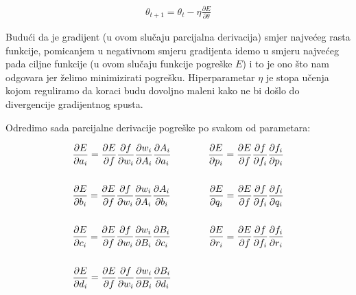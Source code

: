 \documentclass{article}
\begin{document}
\begin{align*}
	\theta_{t+1} = \theta_{t} - \eta\frac{\partial E}{\partial \theta} 
\end{align*}

Budući da je gradijent (u ovom slučaju parcijalna derivacija) smjer najvećeg rasta funkcije, pomicanjem u negativnom smjeru gradijenta idemo u smjeru najvećeg pada ciljne funkcije (u ovom slučaju funkcije pogreške $E$) i to je ono što nam odgovara jer želimo minimizirati pogrešku. Hiperparametar $\eta$ je stopa učenja kojom reguliramo da koraci budu dovoljno maleni kako ne bi došlo do divergencije gradijentnog spusta.


Odredimo sada parcijalne derivacije pogreške po svakom od parametara:

\begin{align*}
	&\frac{\partial E}{\partial a_{i}} = \frac{\partial E}{\partial f} \frac{\partial f}{\partial w_{i}} \frac{\partial w_{i}}{\partial A_{i}} \frac{\partial A_{i}}{\partial a_{i}} \hspace{5mm} & \hspace{5mm} \frac{\partial E}{\partial p_{i}} = \frac{\partial E}{\partial f} \frac{\partial f}{\partial f_{i}} \frac{\partial f_{i}}{\partial p_{i}} \\ \\
	&\frac{\partial E}{\partial b_{i}} = \frac{\partial E}{\partial f} \frac{\partial f}{\partial w_{i}} \frac{\partial w_{i}}{\partial A_{i}} \frac{\partial A_{i}}{\partial b_{i}} \hspace{5mm} & \hspace{5mm} \frac{\partial E}{\partial q_{i}} = \frac{\partial E}{\partial f} \frac{\partial f}{\partial f_{i}} \frac{\partial f_{i}}{\partial q_{i}} \\ \\
	&\frac{\partial E}{\partial c_{i}} = \frac{\partial E}{\partial f} \frac{\partial f}{\partial w_{i}} \frac{\partial w_{i}}{\partial B_{i}} \frac{\partial B_{i}}{\partial c_{i}} \hspace{5mm} & \hspace{5mm} \frac{\partial E}{\partial r_{i}} = \frac{\partial E}{\partial f} \frac{\partial f}{\partial f_{i}} \frac{\partial f_{i}}{\partial r_{i}} \\ \\
	&\frac{\partial E}{\partial d_{i}} = \frac{\partial E}{\partial f} \frac{\partial f}{\partial w_{i}} \frac{\partial w_{i}}{\partial B_{i}} \frac{\partial B_{i}}{\partial d_{i}} 
\end{align*}
\end{document}
